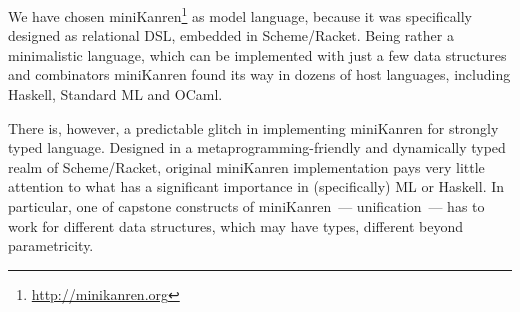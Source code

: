 \documentclass[10pt, oneside, nocopyrightspace]{sigplanconf}
\begin{document}
\begin{comment}
Many logic programming languages, such as Prolog, Mercury
or Curry
to some extent
can be considered as relational.
\end{comment}

We have chosen miniKanren\footnote{\url{http://minikanren.org}} 
as model language, because it was specifically designed as relational DSL, embedded in Scheme/Racket. 
Being rather a minimalistic language, which can be implemented with just a few data structures and
combinators miniKanren found its way in dozens of host languages, including Haskell, 
Standard ML and OCaml.

There is, however, a predictable glitch in implementing miniKanren for strongly typed language. 
Designed in a metaprogramming-friendly and dynamically typed realm of Scheme/Racket, original 
miniKanren implementation pays very little attention to what has a significant importance in (specifically) 
ML or Haskell. In particular, one of capstone constructs of miniKanren~--- unification~--- has to work for 
different data structures, which may have types, different beyond parametricity.
\end{document}
